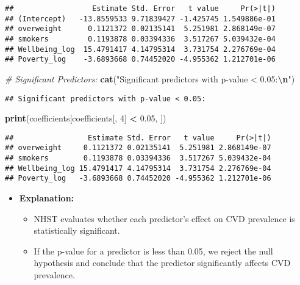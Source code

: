 \documentclass[
]{article}
\newenvironment{Shaded}{\begin{snugshade}}{\end{snugshade}}
\newcommand{\CommentTok}[1]{\textcolor[rgb]{0.56,0.35,0.01}{\textit{#1}}}
\newcommand{\DecValTok}[1]{\textcolor[rgb]{0.00,0.00,0.81}{#1}}
\newcommand{\FloatTok}[1]{\textcolor[rgb]{0.00,0.00,0.81}{#1}}
\newcommand{\FunctionTok}[1]{\textcolor[rgb]{0.13,0.29,0.53}{\textbf{#1}}}
\newcommand{\NormalTok}[1]{#1}
\newcommand{\OtherTok}[1]{\textcolor[rgb]{0.56,0.35,0.01}{#1}}
\newcommand{\SpecialCharTok}[1]{\textcolor[rgb]{0.81,0.36,0.00}{\textbf{#1}}}
\newcommand{\StringTok}[1]{\textcolor[rgb]{0.31,0.60,0.02}{#1}}
\providecommand{\tightlist}{%
  \setlength{\itemsep}{0pt}\setlength{\parskip}{0pt}}
\begin{document}
\begin{Shaded}
\end{Shaded}

\begin{verbatim}
##                  Estimate Std. Error   t value     Pr(>|t|)
## (Intercept)   -13.8559533 9.71839427 -1.425745 1.549886e-01
## overweight      0.1121372 0.02135141  5.251981 2.868149e-07
## smokers         0.1193878 0.03394336  3.517267 5.039432e-04
## Wellbeing_log  15.4791417 4.14795314  3.731754 2.276769e-04
## Poverty_log    -3.6893668 0.74452020 -4.955362 1.212701e-06
\end{verbatim}

\begin{Shaded}
\begin{Highlighting}[]
\CommentTok{\# Significant Predictors:}
\FunctionTok{cat}\NormalTok{(}\StringTok{"Significant predictors with p{-}value \textless{} 0.05:}\SpecialCharTok{\textbackslash{}n}\StringTok{"}\NormalTok{)}
\end{Highlighting}
\end{Shaded}

\begin{verbatim}
## Significant predictors with p-value < 0.05:
\end{verbatim}

\begin{Shaded}
\begin{Highlighting}[]
\FunctionTok{print}\NormalTok{(coefficients[coefficients[, }\DecValTok{4}\NormalTok{] }\SpecialCharTok{\textless{}} \FloatTok{0.05}\NormalTok{, ])}
\end{Highlighting}
\end{Shaded}

\begin{verbatim}
##                 Estimate Std. Error   t value     Pr(>|t|)
## overweight     0.1121372 0.02135141  5.251981 2.868149e-07
## smokers        0.1193878 0.03394336  3.517267 5.039432e-04
## Wellbeing_log 15.4791417 4.14795314  3.731754 2.276769e-04
## Poverty_log   -3.6893668 0.74452020 -4.955362 1.212701e-06
\end{verbatim}

\begin{itemize}
\tightlist
\item
  \textbf{Explanation:}

  \begin{itemize}
  \tightlist
  \item
    NHST evaluates whether each predictor's effect on CVD prevalence is
    statistically significant.
  \item
    If the p-value for a predictor is less than 0.05, we reject the null
    hypothesis and conclude that the predictor significantly affects CVD
    prevalence.
  \end{itemize}
\end{itemize}
\end{document}
